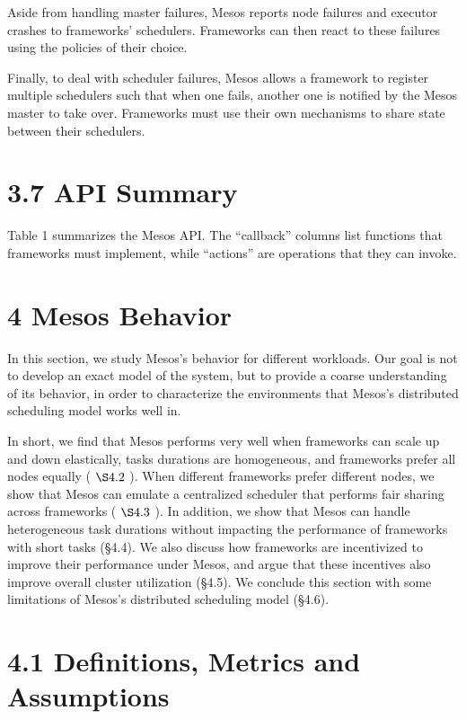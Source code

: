 \documentclass[
]{article}
\begin{document}
Aside from handling master failures, Mesos reports node failures and
executor crashes to frameworks' schedulers. Frameworks can then react to
these failures using the policies of their choice.

Finally, to deal with scheduler failures, Mesos allows a framework to
register multiple schedulers such that when one fails, another one is
notified by the Mesos master to take over. Frameworks must use their own
mechanisms to share state between their schedulers.

\section{3.7 API Summary}\label{api-summary}

Table 1 summarizes the Mesos API. The ``callback'' columns list
functions that frameworks must implement, while ``actions'' are
operations that they can invoke.

\section{4 Mesos Behavior}\label{mesos-behavior}

In this section, we study Mesos's behavior for different workloads. Our
goal is not to develop an exact model of the system, but to provide a
coarse understanding of its behavior, in order to characterize the
environments that Mesos's distributed scheduling model works well in.

In short, we find that Mesos performs very well when frameworks can
scale up and down elastically, tasks durations are homogeneous, and
frameworks prefer all nodes equally ( \(\S4.2\) ). When different
frameworks prefer different nodes, we show that Mesos can emulate a
centralized scheduler that performs fair sharing across frameworks (
\(\S4.3\) ). In addition, we show that Mesos can handle heterogeneous
task durations without impacting the performance of frameworks with
short tasks (§4.4). We also discuss how frameworks are incentivized to
improve their performance under Mesos, and argue that these incentives
also improve overall cluster utilization (§4.5). We conclude this
section with some limitations of Mesos's distributed scheduling model
(§4.6).

\section{4.1 Definitions, Metrics and
Assumptions}\label{definitions-metrics-and-assumptions}
\end{document}
